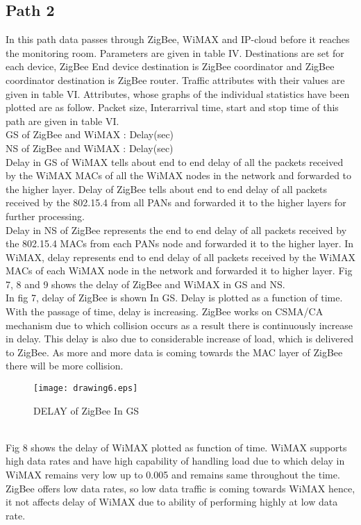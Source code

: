 \documentclass[11pt, conference, compsocconf, onecolumn]{IEEEtran}
\begin{document}
\subsection{Path 2}
\indent In this path data passes through ZigBee, WiMAX and IP-cloud before it reaches the monitoring room. Parameters are given in table IV. Destinations are set for each device, ZigBee End device destination is ZigBee coordinator and ZigBee coordinator destination is ZigBee router. Traffic attributes with their values are given in table VI. Attributes, whose graphs of the individual statistics have been plotted are as follow. Packet size, Interarrival time, start and stop time of this path are given in table VI.\\
\indent GS of ZigBee and WiMAX : Delay(sec)\\
\indent NS of ZigBee and WiMAX : Delay(sec)\\
\indent Delay in GS of WiMAX tells about end to end delay of all the packets received by the WiMAX MACs of all the WiMAX nodes in the network and forwarded to the higher layer. Delay of ZigBee tells about end to end delay of all packets received by the 802.15.4 from all PANs and forwarded it to the higher layers for further processing.\\
\indent Delay in NS of ZigBee represents the end to end delay of all packets received by the 802.15.4 MACs from each PANs node and forwarded it to the higher layer. In WiMAX, delay represents end to end delay of all packets received by the WiMAX MACs of each WiMAX node in the network and forwarded it to higher layer.
Fig 7, 8 and 9 shows the delay of ZigBee and WiMAX in GS and NS.\\
\indent In fig 7, delay of ZigBee is shown In GS. Delay is plotted as a function of time. With the passage of time, delay is increasing. ZigBee works on CSMA/CA mechanism due to which collision occurs as a result there is continuously increase in delay. This delay is also due to considerable increase of load, which is delivered to ZigBee. As more and more data is coming towards the MAC layer of ZigBee there will be more collision.
\begin{figure}[!b]
\centering
\caption{DELAY of ZigBee In GS}
\texttt{[image: drawing6.eps]}
\end{figure}
\\
\indent Fig 8 shows the delay of WiMAX plotted as function of time. WiMAX supports high data rates and have high capability of handling load due to which delay in WiMAX remains very low up to 0.005 and remains same throughout the time. ZigBee offers low data rates, so low data traffic is coming towards WiMAX hence, it not affects delay of WiMAX due to ability of performing highly at low data rate.
\end{document}
